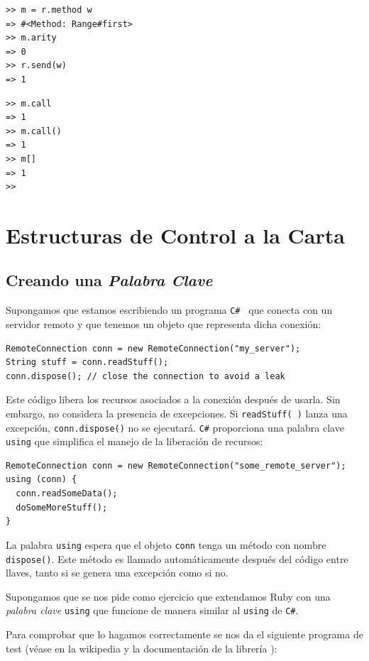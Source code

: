 \begin{verbatim}
>> m = r.method w
=> #<Method: Range#first>
>> m.arity
=> 0
>> r.send(w)
=> 1
\end{verbatim}

\begin{verbatim}
>> m.call
=> 1
>> m.call()
=> 1
>> m[]
=> 1
>> 
\end{verbatim}

\section{Estructuras de Control a la Carta}

\subsection{Creando una {\it Palabra Clave}}

Supongamos que estamos escribiendo 
un programa \verb|C# | que conecta con un servidor remoto
y que tenemos un objeto que representa dicha conexión:


\begin{verbatim}
RemoteConnection conn = new RemoteConnection("my_server"); 
String stuff = conn.readStuff(); 
conn.dispose(); // close the connection to avoid a leak
\end{verbatim}

Este código libera los recursos asociados a la conexión después de usarla.
Sin embargo, no considera la presencia de excepciones.
Si \verb|readStuff( )| lanza una excepción, \verb|conn.dispose()| no
se ejecutará.
\verb|C#| proporciona una palabra clave  \verb|using| 
que simplifica el manejo de la liberación de recursos:

\begin{verbatim}
RemoteConnection conn = new RemoteConnection("some_remote_server"); 
using (conn) {
  conn.readSomeData(); 
  doSomeMoreStuff();
}
\end{verbatim}
La palabra \verb|using| espera que el objeto  \verb|conn| tenga un método con nombre \verb|dispose()|. 
Este método es llamado automáticamente después del código entre llaves, 
tanto si se genera una excepción como si no.


Supongamos que se nos pide como ejercicio que extendamos Ruby con una {\it palabra clave} \verb|using|
que funcione de manera similar al \verb|using| de \verb|C#|.

Para comprobar que lo hagamos correctamente se nos da el siguiente
programa de test (véase  en la wikipedia 
y la documentación de la librería 
):

